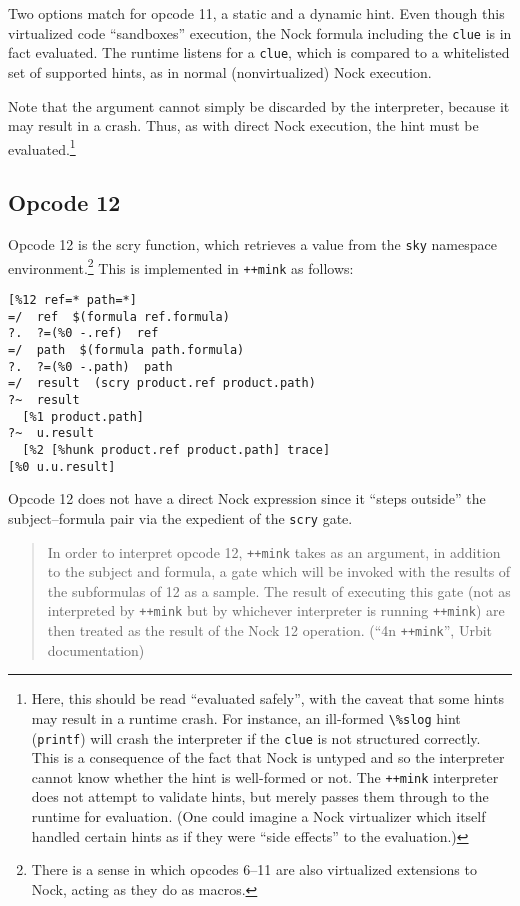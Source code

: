 \documentclass[twoside]{article}
\begin{document}
\noindent
Two options match for opcode 11, a static and a dynamic hint.  Even though this virtualized code ``sandboxes'' execution, the Nock formula including the \texttt{clue} is in fact evaluated.  The runtime listens for a \texttt{clue}, which is compared to a whitelisted set of supported hints, as in normal (nonvirtualized) Nock execution.

Note that the argument cannot simply be discarded by the interpreter, because it may result in a crash.  Thus, as with direct Nock execution, the hint must be evaluated.\footnote{Here, this should be read ``evaluated safely'', with the caveat that some hints may result in a runtime crash.  For instance, an ill-formed \lstinline[style=inlinecode]{\%slog} hint (\texttt{printf}) will crash the interpreter if the \texttt{clue} is not structured correctly.  This is a consequence of the fact that Nock is untyped and so the interpreter cannot know whether the hint is well-formed or not.  The \lstinline[style=inlinecode]{++mink} interpreter does not attempt to validate hints, but merely passes them through to the runtime for evaluation.  (One could imagine a Nock virtualizer which itself handled certain hints as if they were ``side effects'' to the evaluation.)}

\subsection{Opcode 12}

Opcode 12 is the scry function, which retrieves a value from the \lstinline[style=inlinecode]{sky} namespace environment.\footnote{There is a sense in which opcodes 6--11 are also virtualized extensions to Nock, acting as they do as macros.}  This is implemented in \lstinline[style=inlinecode]{++mink} as follows:

\begin{lstlisting}[style=listingcode]
  [%12 ref=* path=*]
=/  ref  $(formula ref.formula)
?.  ?=(%0 -.ref)  ref
=/  path  $(formula path.formula)
?.  ?=(%0 -.path)  path
=/  result  (scry product.ref product.path)
?~  result
  [%1 product.path]
?~  u.result
  [%2 [%hunk product.ref product.path] trace]
[%0 u.u.result]
\end{lstlisting}

\noindent
Opcode 12 does not have a direct Nock expression since it ``steps outside'' the subject--formula pair via the expedient of the \lstinline[style=inlinecode]{scry} gate.

\begin{quote}
  In order to interpret opcode 12, \lstinline[style=inlinecode]{++mink} takes as an argument, in addition to the subject and formula, a gate which will be invoked with the results of the subformulas of 12 as a sample. The result of executing this gate (not as interpreted by \lstinline[style=inlinecode]{++mink} but by whichever interpreter is running \lstinline[style=inlinecode]{++mink}) are then treated as the result of the Nock 12 operation.  (``4n \texttt{++mink}'', Urbit documentation)
\end{quote}
\end{document}
